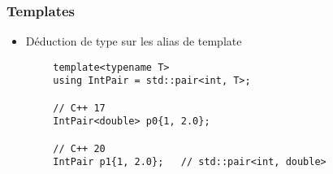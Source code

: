 \documentclass[C++.tex]{subfiles}
\begin{document}
\begin{frame}[fragile]
	\frametitle{Templates}
	\begin{itemize}
		\item Déduction de type sur les alias de template
	\end{itemize}

	\begin{verbatim}
		template<typename T>
		using IntPair = std::pair<int, T>;

		// C++ 17
		IntPair<double> p0{1, 2.0};

		// C++ 20
		IntPair p1{1, 2.0};   // std::pair<int, double>
	\end{verbatim}


\end{frame}
\end{document}
